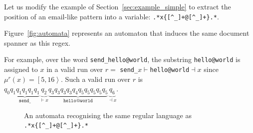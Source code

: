 \documentclass[12px]{article}
\theoremstyle{definition}
\newcommand{\Span}[1]{\left[ #1 \right\rangle}
\begin{document}
        Let us modify the example of Section~\ref{sec:example_simple} to extract
        the position of an email-like pattern into a variable:
        \texttt{.*x\{[\textasciicircum\_]+@[\textasciicircum\_]+\}.*}.

        Figure~\ref{fig:automata} represents an automaton that induces the same
        document spanner as this regex.

        For example, over the word \texttt{send\_hello@world}, the substring
        \texttt{hello@world} is assigned to $x$ in a valid run over $r =$
        \texttt{send\_$x{\vdash}$hello@world${\dashv}x$} since $\mu^r(x) =
        \Span{5, 16}$. Such a valid run over $r$ is $q_0 \underbrace{q_1 q_1 q_1
        q_1 q_1}_\texttt{send\_} \underbrace{q_2}_{{\vdash}x} \underbrace{q_3 q_3
        q_3 q_3 q_4 q_5 q_5 q_5 q_5 q_5}_\texttt{hello@world}
        \underbrace{q_6}_{{\dashv}x}$.

        \begin{figure}[ht]%
          \label{fig:automata}
          \centering
          \caption{%
            An automata recognising the same regular language as
            \texttt{.*x\{[\textasciicircum\_]+@[\textasciicircum\_]+\}.*}
          }%
          \label{ex:intro-1}
        \end{figure}
\end{document}
